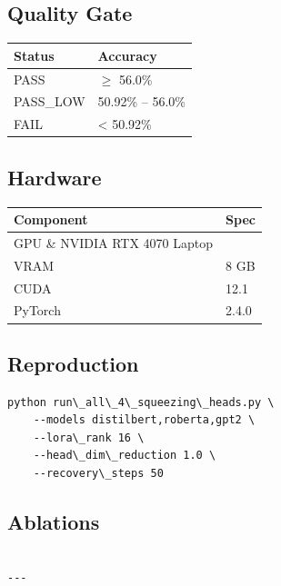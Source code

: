 \subsection{Quality Gate}

\begin{table}[H]
\centering
\small
\begin{tabular}{ll}
\toprule
\textbf{Status} & \textbf{Accuracy} \\
\midrule
PASS & $\ge$ 56.0\% \\
PASS\_LOW & 50.92\% -- 56.0\% \\
FAIL & \textless{} 50.92\% \\
\bottomrule
\end{tabular}
\end{table}

\subsection{Hardware}

\begin{table}[H]
\centering
\small
\begin{tabular}{ll}
\toprule
\textbf{Component} & \textbf{Spec} \\
\midrule
GPU \& NVIDIA RTX 4070 Laptop \\
VRAM & 8 GB \\
CUDA & 12.1 \\
PyTorch & 2.4.0 \\
\bottomrule
\end{tabular}
\end{table}

\subsection{Reproduction}

\begin{lstlisting}
python run\_all\_4\_squeezing\_heads.py \
    --models distilbert,roberta,gpt2 \
    --lora\_rank 16 \
    --head\_dim\_reduction 1.0 \
    --recovery\_steps 50
\end{lstlisting}

\subsection{Ablations}

\begin{lstlisting}

---
\end{lstlisting}